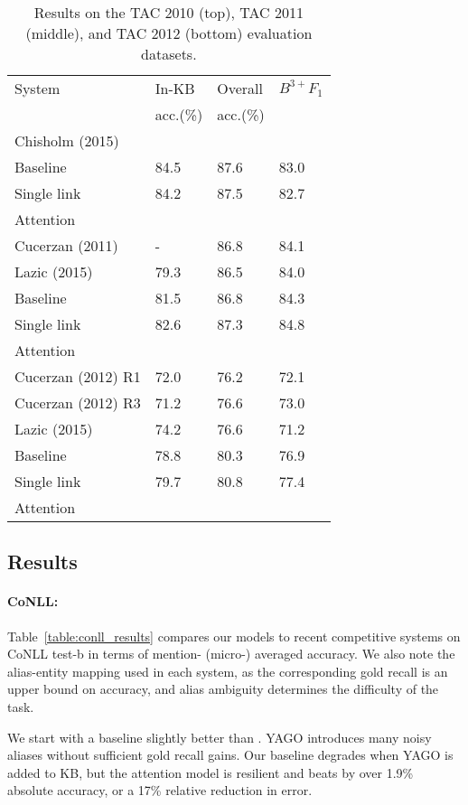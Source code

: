 \begin{table}[ht!]
\centering
\begin{tabular}{l|l|l|l}
 System & In-KB & Overall & {\small ${B^{3+}F_1}$} \\ 
 & acc.(\%) & acc.(\%) & \\
\hline
{Chisholm (2015)} & & & \\
  Baseline & 84.5 & 87.6 & 83.0 \\
 Single link & 84.2 & 87.5 & 82.7\\
 Attention & & & \\
\hline \hline
Cucerzan (2011) & - & 86.8 &  {84.1} \\
Lazic (2015) & 79.3 & 86.5 & 84.0 \\
Baseline & 81.5 & 86.8 & 84.3 \\
Single link & 82.6 & 87.3 & 84.8 \\
 Attention & & & \\
\hline
\hline
Cucerzan (2012) R1 & 72.0 & 76.2 & 72.1  \\
Cucerzan (2012) R3 & 71.2 & {76.6} & { 73.0} \\
Lazic (2015) & {74.2} & {76.6} & 71.2 \\
Baseline &78.8 & 80.3 & 76.9\\
 Single link & 79.7 & 80.8 & 77.4  \\
 Attention & & & \\
\end{tabular}
\caption{Results on the TAC 2010 (top), TAC 2011 (middle), and TAC 2012 (bottom) evaluation datasets. \label{table:tac_results} }
\end{table}


\subsection{Results}

\paragraph*{CoNLL:}
Table~\ref{table:conll_results} compares our models to recent
competitive systems on CoNLL test-b in terms of mention- (micro-)
averaged accuracy.  We also note the alias-entity mapping used in each
system, as the corresponding gold recall is an upper bound on
accuracy, and alias ambiguity determines the difficulty of the task.

We start with a baseline slightly better than .
YAGO introduces many noisy aliases without sufficient gold recall
gains.  Our baseline degrades when YAGO is added to KB, but the
attention model is resilient and beats  by over
1.9\% absolute accuracy, or a 17\% relative reduction in error.

